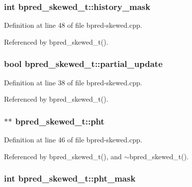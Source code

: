\subsubsection[{history\_\-mask}]{\setlength{\rightskip}{0pt plus 5cm}int {\bf bpred\_\-skewed\_\-t::history\_\-mask}\hspace{0.3cm}{\tt  [protected]}}\label{classbpred__skewed__t_1543468c1f0ddcc2737e08b7e772dd70}




Definition at line 48 of file bpred-skewed.cpp.

Referenced by bpred\_\-skewed\_\-t().
\subsubsection[{partial\_\-update}]{\setlength{\rightskip}{0pt plus 5cm}bool {\bf bpred\_\-skewed\_\-t::partial\_\-update}\hspace{0.3cm}{\tt  [protected]}}\label{classbpred__skewed__t_3bb979a7d0c9943c3cfb47b821f223f6}




Definition at line 38 of file bpred-skewed.cpp.

Referenced by bpred\_\-skewed\_\-t().
\subsubsection[{pht}]{$\ast$$\ast$ {\bf bpred\_\-skewed\_\-t::pht}\hspace{0.3cm}{\tt  [protected]}}\label{classbpred__skewed__t_324768bf0698b0bc59d010102263572e}




Definition at line 46 of file bpred-skewed.cpp.

Referenced by bpred\_\-skewed\_\-t(), and $\sim$bpred\_\-skewed\_\-t().
\subsubsection[{pht\_\-mask}]{\setlength{\rightskip}{0pt plus 5cm}int {\bf bpred\_\-skewed\_\-t::pht\_\-mask}\hspace{0.3cm}{\tt  [protected]}}\label{classbpred__skewed__t_fc0e757b12ca3bbb5de97e8fe9491636}





